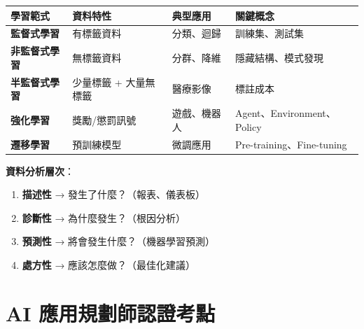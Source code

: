 \documentclass[
  letterpaper,
  DIV=11,
  numbers=noendperiod]{scrreprt}
\providecommand{\tightlist}{%
  \setlength{\itemsep}{0pt}\setlength{\parskip}{0pt}}
\begin{document}
\begin{longtable}[]{@{}
  >{\raggedright\arraybackslash}p{}
  >{\raggedright\arraybackslash}p{}
  >{\raggedright\arraybackslash}p{}
  >{\raggedright\arraybackslash}p{}@{}}
\toprule\noalign{}
\begin{minipage}[b]{\linewidth}\raggedright
學習範式
\end{minipage} & \begin{minipage}[b]{\linewidth}\raggedright
資料特性
\end{minipage} & \begin{minipage}[b]{\linewidth}\raggedright
典型應用
\end{minipage} & \begin{minipage}[b]{\linewidth}\raggedright
關鍵概念
\end{minipage} \\
\midrule\noalign{}
\endhead
\bottomrule\noalign{}
\endlastfoot
\textbf{監督式學習} & 有標籤資料 & 分類、迴歸 & 訓練集、測試集 \\
\textbf{非監督式學習} & 無標籤資料 & 分群、降維 & 隱藏結構、模式發現 \\
\textbf{半監督式學習} & 少量標籤 + 大量無標籤 & 醫療影像 & 標註成本 \\
\textbf{強化學習} & 獎勵/懲罰訊號 & 遊戲、機器人 &
Agent、Environment、Policy \\
\textbf{遷移學習} & 預訓練模型 & 微調應用 & Pre-training、Fine-tuning \\
\end{longtable}

\textbf{資料分析層次}：

\begin{enumerate}
\def\labelenumi{\arabic{enumi}.}
\tightlist
\item
  \textbf{描述性} → 發生了什麼？（報表、儀表板）
\item
  \textbf{診斷性} → 為什麼發生？（根因分析）
\item
  \textbf{預測性} → 將會發生什麼？（機器學習預測）
\item
  \textbf{處方性} → 應該怎麼做？（最佳化建議）
\end{enumerate}

\section{AI
應用規劃師認證考點}\label{ai-ux61c9ux7528ux898fux5283ux5e2bux8a8dux8b49ux8003ux9ede-1}
\end{document}
